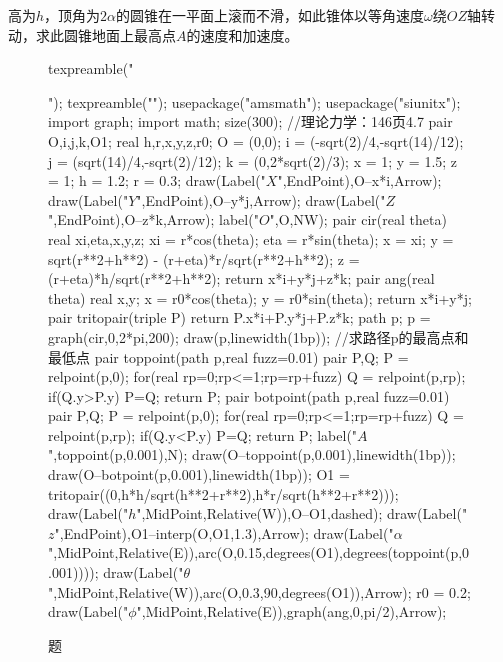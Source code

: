 \begin{question}[146页4.7]
高为$h$，顶角为$2\alpha$的圆锥在一平面上滚而不滑，如此锥体以等角速度$\omega$绕$OZ$轴转动，求此圆锥地面上最高点$A$的速度和加速度。
\begin{figure}[htb]
\centering
\begin{asy}
	texpreamble("\usepackage{xeCJK}");
	texpreamble("");
	usepackage("amsmath");
	usepackage("siunitx");
	import graph;
	import math;
	size(300);
	//理论力学：146页4.7
	pair O,i,j,k,O1;
	real h,r,x,y,z,r0;
	O = (0,0);
	i = (-sqrt(2)/4,-sqrt(14)/12);
	j = (sqrt(14)/4,-sqrt(2)/12);
	k = (0,2*sqrt(2)/3);
	x = 1;
	y = 1.5;
	z = 1;
	h = 1.2;
	r = 0.3;
	draw(Label("$X$",EndPoint),O--x*i,Arrow);
	draw(Label("$Y$",EndPoint),O--y*j,Arrow);
	draw(Label("$Z$",EndPoint),O--z*k,Arrow);
	label("$O$",O,NW);
	pair cir(real theta){
		real xi,eta,x,y,z;
		xi = r*cos(theta);
		eta = r*sin(theta);
		x = xi;
		y = sqrt(r**2+h**2) - (r+eta)*r/sqrt(r**2+h**2);
		z = (r+eta)*h/sqrt(r**2+h**2);
		return x*i+y*j+z*k;
	}
	pair ang(real theta){
		real x,y;
		x = r0*cos(theta);
		y = r0*sin(theta);
		return x*i+y*j;
	}
	pair tritopair(triple P){
		return P.x*i+P.y*j+P.z*k;
	}
	path p;
	p = graph(cir,0,2*pi,200);
	draw(p,linewidth(1bp));
	//求路径p的最高点和最低点
	pair toppoint(path p,real fuzz=0.01){
		pair P,Q;
		P = relpoint(p,0);
		for(real rp=0;rp<=1;rp=rp+fuzz){
			Q = relpoint(p,rp);
			if(Q.y>P.y) P=Q;
		}
		return P;
	}
	pair botpoint(path p,real fuzz=0.01){
		pair P,Q;
		P = relpoint(p,0);
		for(real rp=0;rp<=1;rp=rp+fuzz){
			Q = relpoint(p,rp);
			if(Q.y<P.y) P=Q;
		}
		return P;
	}
	label("$A$",toppoint(p,0.001),N);
	draw(O--toppoint(p,0.001),linewidth(1bp));
	draw(O--botpoint(p,0.001),linewidth(1bp));
	O1 = tritopair((0,h*h/sqrt(h**2+r**2),h*r/sqrt(h**2+r**2)));
	draw(Label("$h$",MidPoint,Relative(W)),O--O1,dashed);
	draw(Label("$z$",EndPoint),O1--interp(O,O1,1.3),Arrow);
	draw(Label("$\alpha$",MidPoint,Relative(E)),arc(O,0.15,degrees(O1),degrees(toppoint(p,0.001))));
	draw(Label("$\theta$",MidPoint,Relative(W)),arc(O,0.3,90,degrees(O1)),Arrow);
	r0 = 0.2;
	draw(Label("$\phi$",MidPoint,Relative(E)),graph(ang,0,pi/2),Arrow);
	\end{asy}
\caption{题\thequestion}
\label{理论力学：146页4.7}
\end{figure}
\end{question}
